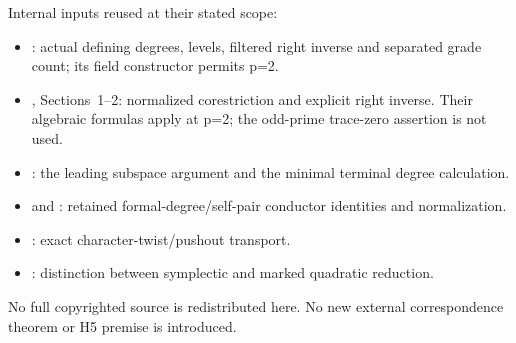 Internal inputs reused at their stated scope:

\begin{itemize}
\tightlist
\item
  : actual defining degrees,
  levels, filtered right inverse and separated grade count; its field
  constructor permits p=2.
\item
  , Sections~1--2:
  normalized corestriction and explicit right inverse. Their algebraic
  formulas apply at p=2; the odd-prime trace-zero assertion is not used.
\item
  : the leading
  subspace argument and the minimal terminal degree calculation.
\item
   and
  :
  retained formal-degree/self-pair conductor identities and
  normalization.
\item
  : exact character-twist/pushout
  transport.
\item
  :
  distinction between symplectic and marked quadratic reduction.
\end{itemize}

No full copyrighted source is redistributed here. No new external
correspondence theorem or H5 premise is introduced.
